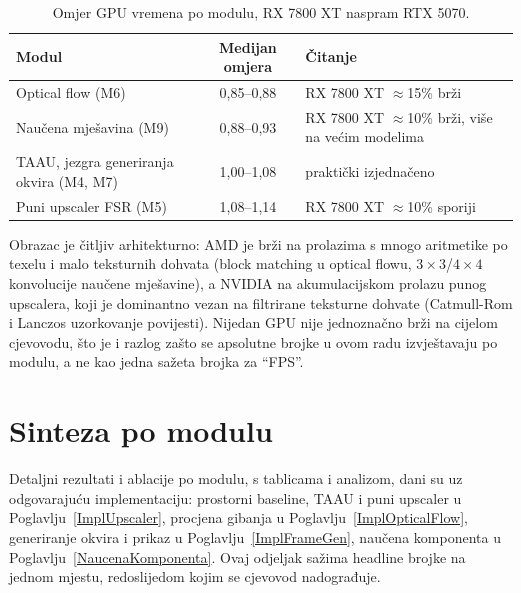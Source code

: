 \documentclass{mathos}
\begin{document}
\begin{table}[hbtp]
\centering
\begin{tabular}{|l|c|l|}\hline
Modul & Medijan omjera & Čitanje \\\hline
Optical flow (M6) & 0,85--0,88 & RX 7800 XT $\approx$15\% brži \\\hline
Naučena mješavina (M9) & 0,88--0,93 & RX 7800 XT $\approx$10\% brži, više na većim modelima \\\hline
TAAU, jezgra generiranja okvira (M4, M7) & 1,00--1,08 & praktički izjednačeno \\\hline
Puni upscaler FSR (M5) & 1,08--1,14 & RX 7800 XT $\approx$10\% sporiji \\\hline
\end{tabular}
\caption{Omjer GPU vremena po modulu, RX 7800 XT naspram RTX 5070.}
\label{table_hw_speed}
\end{table}

Obrazac je čitljiv arhitekturno: AMD je brži na prolazima s mnogo aritmetike
po texelu i malo teksturnih dohvata (block matching u optical flowu,
$3\times3$/$4\times4$ konvolucije naučene mješavine), a NVIDIA na
akumulacijskom prolazu punog upscalera, koji je dominantno vezan na filtrirane
teksturne dohvate (Catmull-Rom i Lanczos uzorkovanje povijesti). Nijedan GPU
nije jednoznačno brži na cijelom cjevovodu, što je i razlog zašto se
apsolutne brojke u ovom radu izvještavaju po modulu, a ne kao jedna
sažeta brojka za ``FPS''.

\section{Sinteza po modulu}

Detaljni rezultati i ablacije po modulu, s tablicama i analizom, dani su uz
odgovarajuću implementaciju: prostorni baseline, TAAU i puni upscaler u
Poglavlju~\ref{ImplUpscaler}, procjena gibanja u Poglavlju~\ref{ImplOpticalFlow},
generiranje okvira i prikaz u Poglavlju~\ref{ImplFrameGen}, naučena
komponenta u Poglavlju~\ref{NaucenaKomponenta}. Ovaj odjeljak sažima
headline brojke na jednom mjestu, redoslijedom kojim se cjevovod nadograđuje.
\end{document}
